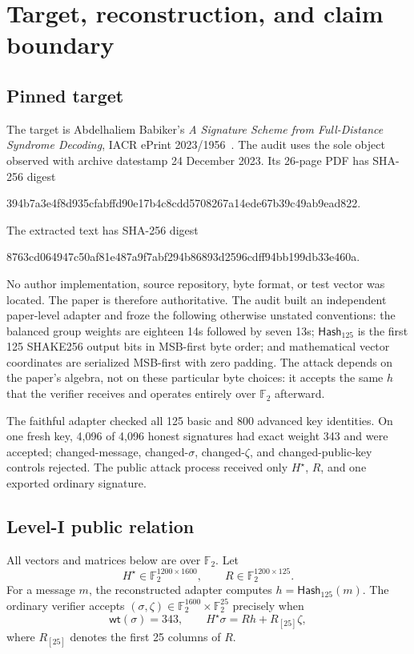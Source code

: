 \documentclass[10pt,a4paper]{article}
\newcommand{\F}{\mathbb{F}}
\newcommand{\wt}{\mathsf{wt}}
\begin{document}
\section{Target, reconstruction, and claim boundary}

\subsection{Pinned target}

The target is Abdelhaliem Babiker's \emph{A Signature Scheme from
Full-Distance Syndrome Decoding}, IACR ePrint 2023/1956~\cite{fdsd}. The audit
uses the sole object observed with archive datestamp 24 December 2023. Its
26-page PDF has SHA-256 digest
\begin{center}
\small\ttfamily
394b7a3e4f8d935cfabffd90e17b4c8cdd5708267a14ede67b39c49ab9ead822.
\end{center}
The extracted text has SHA-256 digest
\begin{center}
\small\ttfamily
8763cd064947c50af81e487a9f7abf294b86893d2596cdff94bb199db33e460a.
\end{center}

No author implementation, source repository, byte format, or test vector was
located. The paper is therefore authoritative. The audit built an independent
paper-level adapter and froze the following otherwise unstated conventions:
the balanced group weights are eighteen 14s followed by seven 13s;
$\mathsf{Hash}_{125}$ is the first 125 SHAKE256 output bits in MSB-first byte
order; and mathematical vector coordinates are serialized MSB-first with zero
padding. The attack depends on the paper's algebra, not on these particular
byte choices: it accepts the same $h$ that the verifier receives and operates
entirely over $\F_2$ afterward.

The faithful adapter checked all 125 basic and 800 advanced key identities.
On one fresh key, 4,096 of 4,096 honest signatures had exact weight 343 and
were accepted; changed-message, changed-$\sigma$, changed-$\zeta$, and
changed-public-key controls rejected. The public attack process received only
$H^\star$, $R$, and one exported ordinary signature.

\subsection{Level-I public relation}

All vectors and matrices below are over $\F_2$. Let
\[
 H^\star\in\F_2^{1200\times1600},\qquad
 R\in\F_2^{1200\times125}.
\]
For a message $m$, the reconstructed adapter computes
$h=\mathsf{Hash}_{125}(m)$. The ordinary verifier accepts
$(\sigma,\zeta)\in\F_2^{1600}\times\F_2^{25}$ precisely when
\begin{equation}
  \wt(\sigma)=343,
  \qquad
  H^\star\sigma=Rh+R_{[25]}\zeta,
  \label{eq:verify}
\end{equation}
where $R_{[25]}$ denotes the first 25 columns of $R$.
\end{document}

